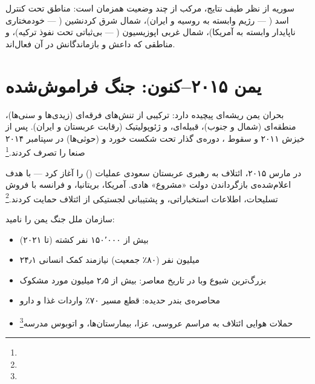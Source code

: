 سوریه از نظر طیف نتایج، مرکب از چند وضعیت همزمان است: مناطق تحت کنترل اسد ( — رژیم وابسته به روسیه و ایران)، شمال شرق کردنشین ( — خودمختاری ناپایدار وابسته به آمریکا)، شمال غربی اپوزیسیون ( — بی‌ثباتی تحت نفوذ ترکیه)، و مناطقی که داعش و بازماندگانش در آن فعال‌اند.


\section{یمن ۲۰۱۵–کنون: جنگ فراموش‌شده}
\label{sec:ch10-yemen}

بحران یمن ریشه‌ای پیچیده دارد: ترکیبی از تنش‌های فرقه‌ای (زیدی‌ها و سنی‌ها)، منطقه‌ای (شمال و جنوب)، قبیله‌ای، و ژئوپولیتیک (رقابت عربستان و ایران). پس از خیزش ۲۰۱۱ و سقوط ، دوره‌ی گذار تحت  شکست خورد و  (حوثی‌ها) در سپتامبر ۲۰۱۴ صنعا را تصرف کردند.\footnote{}

در مارس ۲۰۱۵، ائتلاف به رهبری عربستان سعودی عملیات  () را آغاز کرد — با هدف اعلام‌شده‌ی بازگرداندن دولت «مشروع» هادی. آمریکا، بریتانیا، و فرانسه با فروش تسلیحات، اطلاعات استخباراتی، و پشتیبانی لجستیکی از ائتلاف حمایت کردند.\footnote{}

\begin{tcolorbox}[enemybox, title={فاجعه: بحران انسانی یمن}]
سازمان ملل جنگ یمن را  نامید:
\begin{itemize}
\item بیش از ۱۵۰٬۰۰۰ نفر کشته (تا ۲۰۲۱)
\item ۲۴٫۱ میلیون نفر (۸۰٪ جمعیت) نیازمند کمک انسانی
\item بزرگ‌ترین شیوع وبا در تاریخ معاصر: بیش از ۲٫۵ میلیون مورد مشکوک
\item محاصره‌ی بندر حدیده: قطع مسیر ۷۰٪ واردات غذا و دارو
\item حملات هوایی ائتلاف به مراسم عروسی، عزا، بیمارستان‌ها، و اتوبوس مدرسه\footnote{}
\end{itemize}
\end{tcolorbox}

